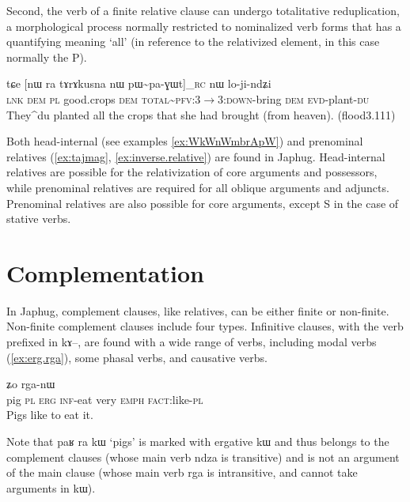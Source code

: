 \documentclass[oldfontcommands,oneside,a4paper,11pt]{article}
\newcommand{\ipa}[1]{{\phon #1}} %
\newcommand{\topic}{\textsc{dem}}
\begin{document}
Second, the verb of a finite relative clause can undergo totalitative reduplication, a morphological process normally restricted to nominalized verb forms that has a quantifying meaning `all' (in reference to the relativized element, in this case normally the P).

  \begin{exe}
\ex \label{ex:pWpaGWt}
\gll
\ipa{tɕe}  	[\ipa{nɯ} \ipa{ra}  	\ipa{tɤrɤkusna} 	\ipa{nɯ}  	\ipa{pɯ\textasciitilde{}pa-ɣɯt}]_{\textsc{rc}}  	\ipa{nɯ}  	\ipa{lo-ji-ndʑi}  \\
\textsc{lnk} \textsc{dem} \textsc{pl} good.crops \topic{} \textsc{total\textasciitilde{}pfv:3$\rightarrow$3:down}-bring \topic{} \textsc{evd}-plant-\textsc{du} \\
\glt They^{du} planted all the crops that she had brought (from heaven). (flood3.111)
\end{exe}

Both head-internal (see examples \ref{ex:WkWnWmbrApW}) and prenominal relatives (\ref{ex:tajmag}, \ref{ex:inverse.relative}) are found in Japhug. Head-internal relatives are possible for the relativization of core arguments and possessors, while prenominal relatives are required for all oblique arguments and adjuncts. Prenominal relatives are also possible for core arguments, except S in the case of stative verbs.

\section{Complementation}
In Japhug, complement clauses, like relatives, can be either finite or non-finite. Non-finite complement clauses include four types. Infinitive clauses, with the verb prefixed in \ipa{kɤ--}, are found with a wide range of verbs, including modal verbs (\ref{ex:erg.rga}), some phasal verbs, and causative verbs. 


 \begin{exe}
\ex \label{ex:erg.rga}
\gll
[\ipa{paʁ}  	\ipa{ra}  	\ipa{kɯ}  	\ipa{kɤ-ndza}]  	\ipa{wuma}  	\ipa{ʑo}  	\ipa{rga-nɯ}  \\
pig \textsc{pl} \textsc{erg} \textsc{inf}-eat very \textsc{emph} \textsc{fact}:like-\textsc{pl} \\
 \glt Pigs like to eat it.
\end{exe}

Note that \ipa{paʁ} \ipa{ra} \ipa{kɯ} `pigs' is marked with ergative \ipa{kɯ} and thus belongs to the complement clauses (whose main verb \ipa{ndza} is transitive) and is not an argument of the main clause (whose main verb \ipa{rga} is intransitive, and cannot take arguments in \ipa{kɯ}).
\end{document}
